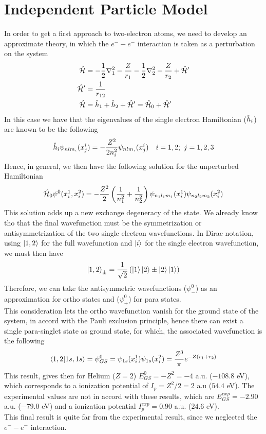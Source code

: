 \documentclass[../qm.tex]{subfiles}
\begin{document}
	\section{Independent Particle Model}
	In order to get a first approach to two-electron atoms, we need to develop an approximate theory, in which the $e^--e^-$ interaction is taken as a perturbation on the system
	\begin{equation}
		\begin{aligned}
			\hat{\mathcal{H}}&=-\frac{1}{2}\nabla^2_1-\frac{Z}{r_1}-\frac{1}{2}\nabla^2_2-\frac{Z}{r_2}+\hat{\mathcal{H}}'\\
			\hat{\mathcal{H}}'&=\frac{1}{r_{12}}\\
			\hat{\mathcal{H}}&=\hat{h}_1+\hat{h}_2+\hat{\mathcal{H}}'=\hat{\mathcal{H}}_0+\hat{\mathcal{H}}'
		\end{aligned}
		\label{eq:indepparticles}
	\end{equation}
	In this case we have that the eigenvalues of the single electron Hamiltonian ($\hat{h}_i$) are known to be the following
	\begin{equation*}
		\hat{h}_i\psi_{nlm_i}(x^i_j)=-\frac{Z^2}{2n_i^2}\psi_{nlm_i}(x^i_j)\quad i=1,2;\ j=1,2,3
	\end{equation*}
	Hence, in general, we then have the following solution for the unperturbed Hamiltonian
	\begin{equation}
		\hat{\mathcal{H}}_0\psi^0(x^1_i,x^2_i)=-\frac{Z^2}{2}\left( \frac{1}{n_1^2}+\frac{1}{n_2^2} \right)\psi_{n_1l_1m_1}(x_i^1)\psi_{n_2l_2m_2}(x_i^2)
		\label{eq:unpertsol2el}
	\end{equation}
	This solution adds up a new exchange degeneracy of the state. We already know tho that the final wavefunction must be the symmetrization or antisymmetrization of the two single electron wavefunctions. In Dirac notation, using $\ket{1,2}$ for the full wavefunction and $\ket{i}$ for the single electron wavefunction, we must then have
	\begin{equation}
		\ket{1,2}_{\pm}=\frac{1}{\sqrt{2}}\left( \ket{1}\ket{2}\pm\ket{2}\ket{1} \right)
		\label{eq:twoelectronatomwf}
	\end{equation}
	Therefore, we can take the antisymmetric wavefunctions ($\psi^0_-$) as an approximation for ortho states and ($\psi^0_+$) for para states.\\
	This consideration lets the ortho wavefunction vanish for the ground state of the system, in accord with the Pauli exclusion principle, hence there can exist a single para-singlet state as ground state, for which, the associated wavefunction is the following
	\begin{equation}
		\bra{1,2}\ket{1s,1s}=\psi_{GS}^0=\psi_{1s}(x_i^1)\psi_{1s}(x_i^2)=\frac{Z^3}{\pi}e^{-Z(r_1+r_2)}
		\label{eq:independentgs}
	\end{equation}
	This result, gives then for Helium ($Z=2$) $E_{GS}^0=-Z^2=-4$ a.u. ($-108.8$ eV), which corresponds to a ionization potential of $I_p=Z^2/2=2$ a.u ($54.4$ eV). The experimental values are not in accord with these results, which are $E_{GS}^{exp}=-2.90$ a.u. ($-79.0$ eV) and a ionization potential $I_p^{exp}=0.90$ a.u. ($24.6$ eV).\\
	This final result is quite far from the experimental result, since we neglected the $e^--e^-$ interaction.
\end{document}
